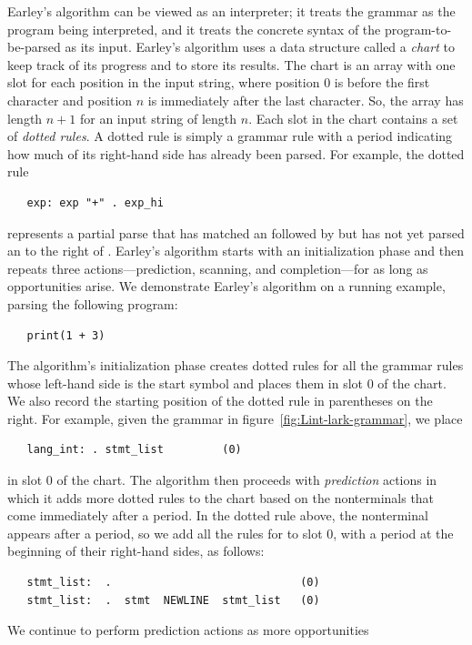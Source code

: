 \documentclass[7x10]{TimesAPriori_MIT}%
\numberwithin{theorem}{chapter}
\numberwithin{definition}{chapter}
\numberwithin{equation}{chapter}
\begin{document}
{Earley's algorithm can be viewed as an interpreter; it treats the
grammar as the program being interpreted, and it treats the concrete
syntax of the program-to-be-parsed as its input.  Earley's algorithm
uses a data structure called a \emph{chart} to
keep track of its progress and to store its results. The chart is an
array with one slot for each position in the input string, where
position $0$ is before the first character and position $n$ is
immediately after the last character. So, the array has length $n+1$
for an input string of length $n$. Each slot in the chart contains a
set of \emph{dotted rules}. A dotted rule is simply a grammar rule
with a period indicating how much of its right-hand side has already
been parsed. For example, the dotted rule
\begin{lstlisting}
   exp: exp "+" . exp_hi
\end{lstlisting}
represents a partial parse that has matched an  followed by
\code{+} but has not yet parsed an  to the right of
\code{+}.
%
Earley's algorithm starts with an initialization phase and then
repeats three actions---prediction, scanning, and completion---for as
long as opportunities arise. We demonstrate Earley's algorithm on a
running example, parsing the following program:
\begin{lstlisting}
   print(1 + 3)
\end{lstlisting}
The algorithm's initialization phase creates dotted rules for all the
grammar rules whose left-hand side is the start symbol and places them
in slot $0$ of the chart. We also record the starting position of the
dotted rule in parentheses on the right. For example, given the
grammar in figure~\ref{fig:Lint-lark-grammar}, we place
\begin{lstlisting}
   lang_int: . stmt_list         (0)
\end{lstlisting}
in slot $0$ of the chart. The algorithm then proceeds with
\emph{prediction} actions in which it adds more dotted rules to the
chart based on the nonterminals that come immediately after a period. In
the dotted rule above, the nonterminal  appears after a period,
so we add all the rules for  to slot $0$, with a
period at the beginning of their right-hand sides, as follows:
\begin{lstlisting}
   stmt_list:  .                             (0)
   stmt_list:  .  stmt  NEWLINE  stmt_list   (0)
\end{lstlisting}
We continue to perform prediction actions as more opportunities
}
\end{document}
